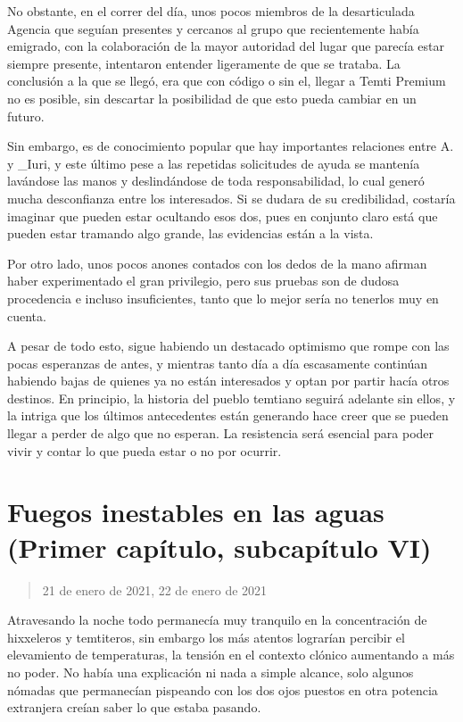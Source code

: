 \documentclass[
  spanish,
]{book}
\begin{document}
No obstante, en el correr del día, unos pocos miembros de la desarticulada Agencia que seguían presentes y cercanos al grupo que recientemente había emigrado, con la colaboración de la mayor autoridad del lugar que parecía estar siempre presente, intentaron entender ligeramente de que se trataba.
La conclusión a la que se llegó, era que con código o sin el, llegar a Temti Premium no es posible, sin descartar la posibilidad de que esto pueda cambiar en un futuro.

Sin embargo, es de conocimiento popular que hay importantes relaciones entre A. y \_Iuri, y este último pese a las repetidas solicitudes de ayuda se mantenía lavándose las manos y deslindándose de toda responsabilidad, lo cual generó mucha desconfianza entre los interesados. Si se dudara de su credibilidad, costaría imaginar que pueden estar ocultando esos dos, pues en conjunto claro está que pueden estar tramando algo grande, las evidencias están a la vista.

Por otro lado, unos pocos anones contados con los dedos de la mano afirman haber experimentado el gran privilegio, pero sus pruebas son de dudosa procedencia e incluso insuficientes, tanto que lo mejor sería no tenerlos muy en cuenta.

A pesar de todo esto, sigue habiendo un destacado optimismo que rompe con las pocas esperanzas de antes, y mientras tanto día a día escasamente continúan habiendo bajas de quienes ya no están interesados y optan por partir hacía otros destinos. En principio, la historia del pueblo temtiano seguirá adelante sin ellos, y la intriga que los últimos antecedentes están generando hace creer que se pueden llegar a perder de algo que no esperan. La resistencia será esencial para poder vivir y contar lo que pueda estar o no por ocurrir.

\hypertarget{fuegos-inestables-en-las-aguas-primer-capuxedtulo-subcapuxedtulo-vi}{%
\section{Fuegos inestables en las aguas (Primer capítulo, subcapítulo VI)}\label{fuegos-inestables-en-las-aguas-primer-capuxedtulo-subcapuxedtulo-vi}}

\begin{quote}
21 de enero de 2021, 22 de enero de 2021
\end{quote}

Atravesando la noche todo permanecía muy tranquilo en la concentración de hixxeleros y temtiteros, sin embargo los más atentos lograrían percibir el elevamiento de temperaturas, la tensión en el contexto clónico aumentando a más no poder.
No había una explicación ni nada a simple alcance, solo algunos nómadas que permanecían pispeando con los dos ojos puestos en otra potencia extranjera creían saber lo que estaba pasando.
\end{document}
